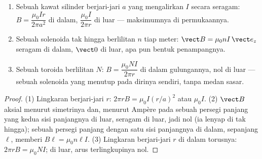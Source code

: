 \begin{proposition}\label{prop:b1:magnetostatics:ampereapps}
\begin{enumerate}
  \item Sebuah kawat silinder berjari-jari $a$ yang mengalirkan $I$ secara seragam:
        $B = \dfrac{\mu_0Ir}{2\pi a^2}$ di dalam, $\dfrac{\mu_0I}{2\pi r}$ di luar
        --- maksimumnya di permukaannya.
  \item Sebuah solenoida tak hingga berlilitan $n$ tiap meter: $\vect B = \mu_0nI\,
        \vect e_z$ seragam di dalam, $\vect 0$ di luar, apa pun bentuk
        penampangnya.
  \item Sebuah toroida berlilitan $N$: $B = \dfrac{\mu_0NI}{2\pi r}$ di dalam
        gulungannya, nol di luar --- sebuah solenoida yang menutup pada dirinya
        sendiri, tanpa medan sasar.
\end{enumerate}
\end{proposition}

\begin{proof}
(1) Lingkaran berjari-jari $r$: $2\pi rB = \mu_0I(r/a)^2$ atau $\mu_0I$. (2) $\vect B$
aksial menurut simetrinya dan, menurut Ampère pada sebuah persegi panjang yang kedua
sisi panjangnya di luar, seragam di luar, jadi nol (ia lenyap di tak hingga); sebuah
persegi panjang dengan satu sisi panjangnya di dalam, sepanjang $\ell$, memberi $B\ell =
\mu_0n\ell I$. (3) Lingkaran berjari-jari $r$ di dalam torusnya: $2\pi rB =
\mu_0NI$; di luar, arus terlingkupinya nol.
\end{proof}

